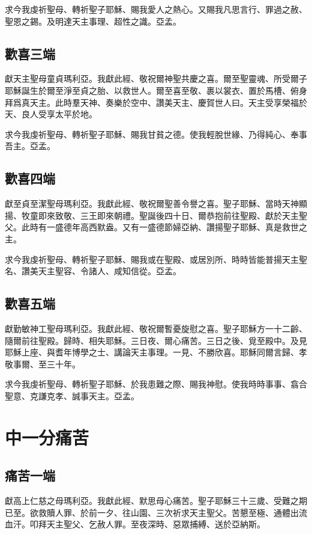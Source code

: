 求{\cspace}今我虔祈聖母、轉祈聖子耶穌、賜我愛人之熱心。又賜我凡思言行、罪過之赦、聖恩之錫。及明達天主事理、超性之識。{\cspace}亞孟。

\subsection*{歡喜三端}
獻{\cspace}天主聖母童貞瑪利亞。我獻此經、敬祝爾神聖共慶之喜。爾至聖靈魂、所受爾子耶穌誕生於爾至淨至貞之胎、以救世人。爾至喜至敬、裹以裳衣、置於馬槽、俯身拜爲真天主。此時羣天神、奏樂於空中、讚美天主、慶賀世人曰。天主受享榮福於天、良人受享太平於地。

求{\cspace}今我虔祈聖母、轉祈聖子耶穌、賜我甘貧之德。使我輕脫世緣、乃得純心、奉事吾主。亞孟。

\subsection*{歡喜四端}
獻{\cspace}至貞至潔聖母瑪利亞。我獻此經、敬祝爾聖善令譽之喜。聖子耶穌、當時天神顯揚、牧童即來致敬、三王即來朝禮。聖誕後四十日、爾恭抱前往聖殿、獻於天主聖父。此時有一盛德年高西默盎。又有一盛德節婦亞納、讚揚聖子耶穌、真是救世之主。

求{\cspace}今我虔祈聖母、轉祈聖子耶穌、賜我或在聖殿、或居別所、時時皆能普揚天主聖名、讚美天主聖容、令諸人、咸知信從。{\cspace}亞孟。

\subsection*{歡喜五端}
獻{\cspace}勤敏神工聖母瑪利亞。我獻此經、敬祝爾暫憂旋慰之喜。聖子耶穌方一十二齡、隨爾前往聖殿。歸時、相失耶穌。三日夜、爾心痛苦。三日之後、覓至殿中。及見耶穌上座、與耆年博學之士、講論天主事理。一見、不勝欣喜。耶穌同爾言歸、孝敬事爾、至三十年。

求{\cspace}今我虔祈聖母、轉祈聖子耶穌、於我患難之際、賜我神慰。使我時時事事、翕合聖意、克謙克孝、誠事天主。{\cspace}亞孟。

\section*{中一分痛苦}
\subsection{痛苦一端}
獻{\cspace}高上仁慈之母瑪利亞。我獻此經、默思母心痛苦。聖子耶穌三十三歲、受難之期已至。欲救贖人罪、於前一夕、往山園、三次祈求天主聖父。苦懇至極、通體出流血汗。叩拜天主聖父、乞赦人罪。至夜深時、惡眾捕縛、送於亞納斯。

